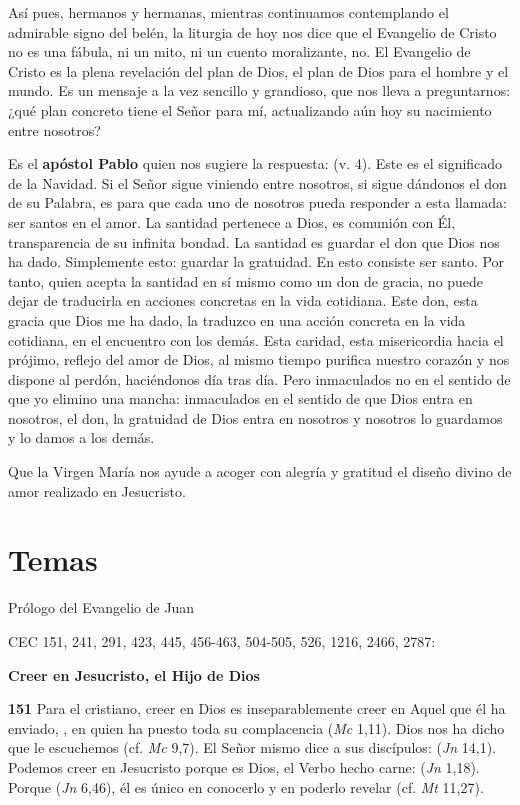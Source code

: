 Así pues, hermanos y hermanas, mientras continuamos contemplando el admirable signo del belén, la liturgia de hoy nos dice que el Evangelio de Cristo no es una fábula, ni un mito, ni un cuento moralizante, no. El Evangelio de Cristo es la plena revelación del plan de Dios, el plan de Dios para el hombre y el mundo. Es un mensaje a la vez sencillo y grandioso, que nos lleva a preguntarnos: ¿qué plan concreto tiene el Señor para mí, actualizando aún hoy su nacimiento entre nosotros?

Es el \textbf{apóstol Pablo} quien nos sugiere la respuesta:  (v. 4). Este es el significado de la Navidad. Si el Señor sigue viniendo entre nosotros, si sigue dándonos el don de su Palabra, es para que cada uno de nosotros pueda responder a esta llamada: ser santos en el amor. La santidad pertenece a Dios, es comunión con Él, transparencia de su infinita bondad. La santidad es guardar el don que Dios nos ha dado. Simplemente esto: guardar la gratuidad. En esto consiste ser santo. Por tanto, quien acepta la santidad en sí mismo como un don de gracia, no puede dejar de traducirla en acciones concretas en la vida cotidiana. Este don, esta gracia que Dios me ha dado, la traduzco en una acción concreta en la vida cotidiana, en el encuentro con los demás. Esta caridad, esta misericordia hacia el prójimo, reflejo del amor de Dios, al mismo tiempo purifica nuestro corazón y nos dispone al perdón, haciéndonos  día tras día. Pero inmaculados no en el sentido de que yo elimino una mancha: inmaculados en el sentido de que Dios entra en nosotros, el don, la gratuidad de Dios entra en nosotros y nosotros lo guardamos y lo damos a los demás.

Que la Virgen María nos ayude a acoger con alegría y gratitud el diseño divino de amor realizado en Jesucristo.



\section{Temas}

Prólogo del Evangelio de Juan

CEC 151, 241, 291, 423, 445, 456-463, 504-505, 526, 1216, 2466, 2787:

\textbf{Creer en Jesucristo, el Hijo de Dios}

\textbf{151} Para el cristiano, creer en Dios es inseparablemente creer en Aquel que él ha enviado, , en quien ha puesto toda su complacencia (\emph{Mc} 1,11). Dios nos ha dicho que le escuchemos (cf. \emph{Mc} 9,7). El Señor mismo dice a sus discípulos:  (\emph{Jn} 14,1). Podemos creer en Jesucristo porque es Dios, el Verbo hecho carne:  (\emph{Jn} 1,18). Porque  (\emph{Jn} 6,46), él es único en conocerlo y en poderlo revelar (cf. \emph{Mt} 11,27).


